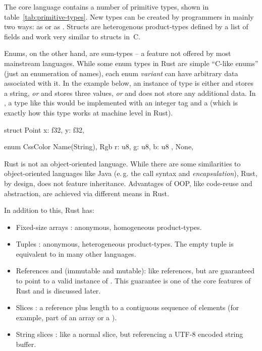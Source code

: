 The core language contains a number of primitive types, shown in table~\ref{tab:primitive-types}.
New types can be created by programmers in mainly two ways: as  or as .
Structs are heterogenous product-types  defined by a list of fields and work very similar to structs in~C.

Enums, on the other hand, are sum-types -- a feature not offered by most mainstream languages.
While some enum types in Rust are simple \enquote{C-like enums} (just an enumeration of names), each enum \emph{variant} can have arbitrary data associated with it.
In the example below, an instance of type  is either  and stores a string, \emph{or}  and stores three  values, \emph{or}  and does not store any additional data.
In \cpp, a type like this would be implemented with an integer tag and a  (which is exactly how this type works at machine level in Rust).

\vspace{-3mm}
\begin{center}
\begin{minipage}[t]{.45\textwidth}
\begin{rustcode}
struct Point {
    x: f32,
    y: f32,
}
\end{rustcode}
\end{minipage}
\begin{minipage}[t]{.45\textwidth}
\begin{rustcode}
enum CssColor {
    Name(String),
    Rgb { r: u8, g: u8, b: u8 },
    None,
}
\end{rustcode}
\end{minipage}
\end{center}

Rust is not an object-oriented language.
While there are some similarities to object-oriented languages like Java (e.\,g. the  call syntax and \emph{encapsulation}), Rust, by design, does not feature inheritance.
Advantages of OOP, like code-reuse and abstraction, are achieved via different means in Rust.

In addition to this, Rust has:
\vspace{-3mm}
\begin{itemize}
  \item Fixed-size arrays \code{[T; N]}: anonymous, homogeneous product-types.
  \item Tuples : anonymous, heterogeneous product-types. The empty tuple \code{()} is equivalent to  in many other languages.
  \item References  and  (immutable and mutable): like \cpp references, but are guaranteed to point to a valid instance of .
  This guarantee is one of the core features of Rust and is discussed later.
  \item Slices \code{&[T]}: a reference plus length to a contiguous sequence of elements (for example, part of an array or a ).
  \item String slices : like a normal slice, but referencing a UTF-8 encoded string buffer.
\end{itemize}

